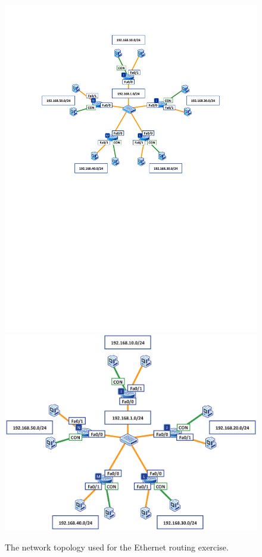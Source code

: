 \begin{figure}
\centering
\ifpdf
\includegraphics[width=0.9\linewidth]{Figures/RoutingEthernet.pdf}
\else
\includegraphics[width=0.9\linewidth]{Figures/RoutingEthernet.eps}
\fi
\caption{The network topology used for the Ethernet routing exercise.}
\label{fig:RoutingEthernet}
\end{figure}

